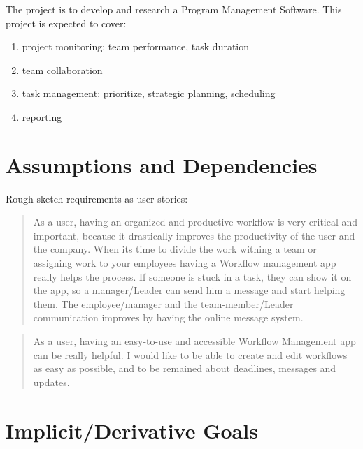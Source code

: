 \documentclass{article}[draft]
\begin{document}
The project is to develop and research a Program Management Software. This project is expected to cover:
\begin{enumerate}
    \item project monitoring: team performance, task duration
    \item team collaboration
    \item task management: prioritize, strategic planning,  scheduling
    \item reporting
\end{enumerate}

\section{Assumptions and Dependencies}
\vspace{10pt}
Rough sketch requirements as user stories:
\begin{quotation}
    As a user, having an organized and productive workflow is very critical and important, because it drastically improves the productivity of the user and the company. When its time to divide the work withing a team or assigning work to your employees having a Workflow management app really helps the process. If someone is stuck in a task, they can show it on the app, so a manager/Leader can send him a message and start helping them. The employee/manager and the team-member/Leader communication improves by having the online message system.
\end{quotation}
\begin{quotation}
    As a user, having an easy-to-use and accessible Workflow Management app can be really helpful. I would like to be able to create and edit workflows as easy as possible, and to be remained about deadlines, messages and updates.
\end{quotation}

\section{Implicit/Derivative Goals}
\vspace{10pt}
\end{document}
